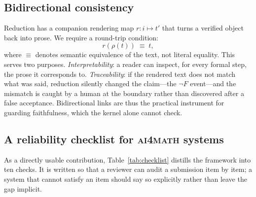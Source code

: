 \documentclass[11pt,a4paper]{article}
\newcommand{\reducemap}{\rho}
\newcommand{\rendermap}{r}
\theoremstyle{plain}
\theoremstyle{definition}
\theoremstyle{remark}
\begin{document}
\subsection{Bidirectional consistency}\label{sec:bidir}
Reduction has a companion rendering map $\rendermap: i\mapsto t'$ that turns
a verified object back into prose. We require a round-trip condition:
\begin{equation}
\rendermap(\reducemap(t)) \;\equiv\; t ,
\end{equation}
where $\equiv$ denotes semantic equivalence of the text, not literal
equality. This serves two purposes. \emph{Interpretability}: a reader can
inspect, for every formal step, the prose it corresponds to.
\emph{Traceability}: if the rendered text does not match what was said,
reduction silently changed the claim---the $\neg F$ event---and the
mismatch is caught by a human at the boundary rather than discovered after
a false acceptance. Bidirectional links are thus the practical instrument
for guarding faithfulness, which the kernel alone cannot check.

\subsection{A reliability checklist for \textsc{ai4math} systems}\label{sec:checklist}
As a directly usable contribution, Table~\ref{tab:checklist} distills the
framework into ten checks. It is written so that a reviewer can audit a
submission item by item; a system that cannot satisfy an item should say so
explicitly rather than leave the gap implicit.
\end{document}
